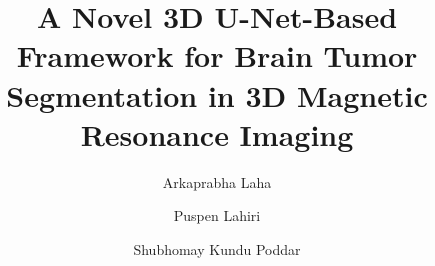 \documentclass[a4paper,fleqn]{cas-dc}
\begin{document}
\let\WriteBookmarks\relax
\raggedbottom

\renewcommand{\topfraction}{.95}
\renewcommand{\bottomfraction}{.85}
\renewcommand{\textfraction}{.05}
\renewcommand{\floatpagefraction}{.8}
\renewcommand{\dbltopfraction}{.95}
\renewcommand{\dblfloatpagefraction}{.8}

\setcounter{topnumber}{5}
\setcounter{bottomnumber}{5}
\setcounter{totalnumber}{10}
\setcounter{dbltopnumber}{5}

\setlength{\dbltextfloatsep}{6pt plus 2pt minus 2pt}
\setlength{\textfloatsep}{6pt plus 2pt minus 2pt}





\title[mode = title]{A Novel 3D U-Net-Based Framework for Brain Tumor Segmentation in 3D Magnetic Resonance Imaging}






\author[1,4]{Arkaprabha Laha}
\cormark[1]

\author[1]{Puspen Lahiri}

\author[1]{Shubhomay Kundu Poddar}
\end{document}

